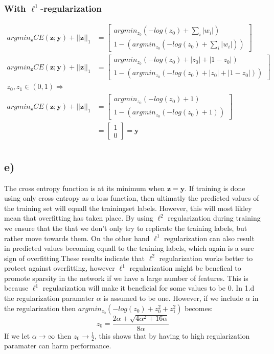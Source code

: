 \documentclass{article}
\begin{document}
\subsubsection*{With $\ell^1$-regularization}
\begin{equation}
    \begin{split}
        argmin_\mathbf{z} CE(\mathbf{z}; \mathbf{y}) + ||\mathbf{z}||_1 &=\begin{bmatrix}argmin_{z_0}(-log(z_0)+ \sum_i |w_i|)\\1-\left(argmin_{z_0}(-log(z_0)+ \sum_i |w_i|)\right)\end{bmatrix}\\
        argmin_\mathbf{z} CE(\mathbf{z}; \mathbf{y}) + ||\mathbf{z}||_1 &=\begin{bmatrix}argmin_{z_0}(-log(z_0)+ |z_0|+|1-z_0|)\\1-\left(argmin_{z_0}(-log(z_0)+ |z_0|+|1-z_0|)\right)\end{bmatrix}\\
        z_0,z_1 \in (0,1)\Rightarrow\\
        argmin_\mathbf{z} CE(\mathbf{z}; \mathbf{y}) + ||\mathbf{z}||_1 &=\begin{bmatrix}argmin_{z_0}(-log(z_0)+ 1)\\1-\left(argmin_{z_0}(-log(z_0)+1)\right)\end{bmatrix}\\
        &=\begin{bmatrix}1\\0\end{bmatrix} = \mathbf{y}\\
    \end{split}
\end{equation}

\subsection*{e)}
The cross entropy function is at its minimum when $\mathbf{z}=\mathbf{y}$. If training is done using only cross entropy as a loss function, then ultimatly the predicted values of the training set will equall the trainingset labels. However, this will most likley mean that overfitting has taken place. By using $\ell^2$ regularization during training we ensure that the that we don't only try to replicate the training labels, but rather move towards them. On the other hand $\ell^1$ regularization can also result in predicted values becoming equall to the training labels, which again is a sure sign of overfitting.These results indicate that $\ell^2$ regularization works better to protect against overfitting, however $\ell^1$ regularization might be benefical to promote sparsity in the network if we have a large number of features. This is because $\ell^1$ regularization will make it beneficial for some values to be $0$. In 1.d the regularization paramater $\alpha$ is assumed to be one. However, if we include $\alpha$ in the regularization then $argmin_{z_0}(-log(z_0)+z_0^2+z_1^2)$ becomes: $$z_0=\frac{2\alpha + \sqrt{4\alpha^2+16\alpha}}{8\alpha}$$ If we let $\alpha\to\infty$ then $z_0\to\frac{1}{2}$, this shows that by having to high regularization paramater can harm performance.
\end{document}
